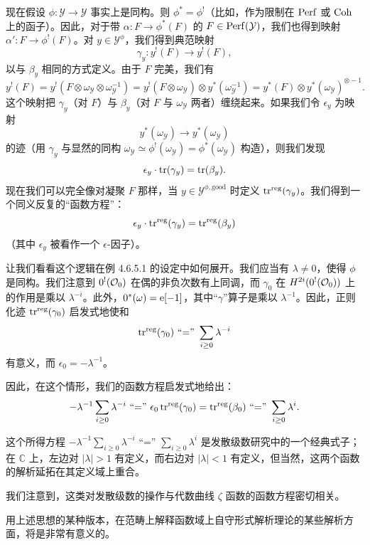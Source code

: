 \begin{remark}[正则化迹与函数方程]
现在假设 $\phi\colon\mathcal{Y}\to\mathcal{Y}$ 事实上是同构。则 $\phi^*=\phi^!$（比如，作为限制在 $\mathrm{Perf}$ 或 $\mathrm{Coh}$ 上的函子）。因此，对于带 $\alpha\colon F\to\phi^*(F)$ 的 $F\in\mathrm{Perf}(\mathcal{Y})$，我们也得到映射 $\alpha'\colon F\to\phi^!(F)$。对 $y\in\mathcal{Y}^{\phi}$，我们得到典范映射
\[
  \gamma_y\colon y^!(F)\to y^!(F),
\]
以与 $\beta_y$ 相同的方式定义。由于 $F$ 完美，我们有
\[
  y^!(F)=y^!(F\otimes\omega_{\mathcal{Y}}\otimes\omega_{\mathcal{Y}}^{-1})
  =y^!(F\otimes\omega_{\mathcal{Y}})\otimes y^*(\omega_{\mathcal{Y}}^{-1})
  =y^*(F)\otimes y^*(\omega_{\mathcal{Y}})^{\otimes-1}.
\]
这个映射把 $\gamma_y$（对 $F$）与 $\beta_y$（对 $F$ 与 $\omega_{\mathcal{Y}}$ 两者）缠绕起来。如果我们令 $\epsilon_y$ 为映射
\[
  y^*(\omega_{\mathcal{Y}})\to y^*(\omega_{\mathcal{Y}})
\]
的迹（用 $\gamma_y$ 与显然的同构 $\omega_{\mathcal{Y}}\simeq\phi^!(\omega_{\mathcal{Y}})=\phi^*(\omega_{\mathcal{Y}})$ 构造），则我们发现
\[
  \epsilon_y\cdot\operatorname{tr}(\gamma_y)=\operatorname{tr}(\beta_y).
\]
现在我们可以完全像对凝聚 $F$ 那样，当 $y\in\mathcal{Y}^{\phi,\mathrm{good}}$ 时定义 $\operatorname{tr}^{\mathrm{reg}}(\gamma_y)$。我们得到一个同义反复的“函数方程”：
\[
  \epsilon_y\cdot\operatorname{tr}^{\mathrm{reg}}(\gamma_y)=\operatorname{tr}^{\mathrm{reg}}(\beta_y)
\]
（其中 $\epsilon_y$ 被看作一个 $\epsilon$-因子）。

让我们看看这个逻辑在例 4.6.5.1 的设定中如何展开。我们应当有 $\lambda\neq 0$，使得 $\phi$ 是同构。我们注意到 $0^!(\mathcal{O}_0)$ 在偶的非负次数有上同调，而 $\gamma_0$ 在 $H^{2i}(0^!(\mathcal{O}_0))$ 上的作用是乘以 $\lambda^{-i}$。此外，$0^*(\omega)=\mathrm{e}[-1]$，其中“$\gamma$”算子是乘以 $\lambda^{-1}$。因此，正则化迹 $\operatorname{tr}^{\mathrm{reg}}(\gamma_0)$ 启发式地使和
\[
  \operatorname{tr}^{\mathrm{reg}}(\gamma_0)\text{ “=” }\sum_{i\ge 0}\lambda^{-i}
\]
有意义，而 $\epsilon_0=-\lambda^{-1}$。

因此，在这个情形，我们的函数方程启发式地给出：
\[
  -\lambda^{-1}\sum_{i\ge 0}\lambda^{-i}\text{ “=” }
  \epsilon_0\operatorname{tr}^{\mathrm{reg}}(\gamma_0)=\operatorname{tr}^{\mathrm{reg}}(\beta_0)
  \text{ “=” }\sum_{i\ge 0}\lambda^i.
\]
\end{remark}

这个所得方程 $-\lambda^{-1}\sum_{i\ge 0}\lambda^{-i}\text{ “=” }\sum_{i\ge 0}\lambda^i$ 是发散级数研究中的一个经典式子；在 $\mathbb{C}$ 上，左边对 $|\lambda|>1$ 有定义，而右边对 $|\lambda|<1$ 有定义，但当然，这两个函数的解析延拓在其定义域上重合。

我们注意到，这类对发散级数的操作与代数曲线 $\zeta$ 函数的函数方程密切相关。

\begin{remark}
用上述思想的某种版本，在范畴上解释函数域上自守形式解析理论的某些解析方面，将是非常有意义的。
\end{remark}

